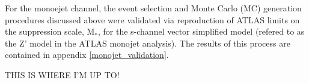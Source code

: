 \begin{flushleft}

For the monoejet channel, the event selection and Monte Carlo (MC) generation procedures discussed above were validated via reproduction of ATLAS limits on the suppression scale, M$_{*}$, for the s-channel vector simplified model (refered to as the Z' model in the ATLAS monojet analysis). The results of this process are contained in appendix \ref{monojet_validation}.
\bigskip


THIS IS WHERE I'M UP TO!

\end{flushleft}

